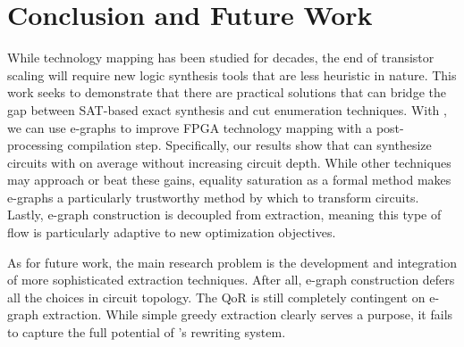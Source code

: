 \section{Conclusion and Future Work}\label{sec:conclusion}
While technology mapping has been studied for decades, the end of transistor
scaling will require new logic synthesis tools that are less heuristic in
nature. This work seeks to demonstrate that there are practical solutions that
can bridge the gap between SAT-based exact synthesis and cut enumeration
techniques. With \shortname{}, we can use e-graphs to improve FPGA technology
mapping with a post-processing compilation step. Specifically, our results show
that \shortname{} can synthesize circuits with \metric{} on average without
increasing circuit depth. While other techniques may approach or beat these
gains, equality saturation as a formal method makes e-graphs a particularly
trustworthy method by which to transform circuits. Lastly, e-graph construction
is decoupled from extraction, meaning this type of flow is particularly
adaptive to new optimization objectives.

As for future work, the main research problem is the development and
integration of more sophisticated extraction techniques. After all, e-graph
construction defers all the choices in circuit topology. The QoR is still
completely contingent on e-graph extraction. While simple greedy extraction
clearly serves a purpose, it fails to capture the full potential of
\shortname{}'s rewriting system.